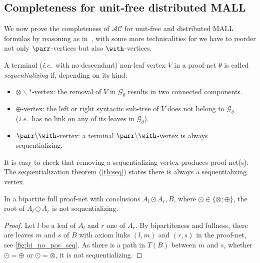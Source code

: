 \documentclass{lmcs}
\newcommand*{\tens}{\otimes} %
\newcommand*{\pw}{\parr\backslash\with} %
\newcommand*{\ie}{\emph{i.e.}}
\newcommand*{\G}{\mathcal{G}}
\newcommand*{\AC}{\mathcal{AC}} %
\begin{document}

\subsection{Completeness for unit-free distributed MALL}
\label{sec:compl_unit_free}

We now prove the completeness of $\AC$ for unit-free and distributed MALL formulas by reasoning as in~\cite[Section~4]{mllisos}, with some more technicalities for we have to reorder not only $\parr$-vertices but also $\with$-vertices.

\begin{defi}
\label{def:sequentializing}
A terminal (\ie\ with no descendant) non-leaf vertex $V$ in a proof-net $\theta$ is called \emph{sequentializing} if, depending on its kind:
\begin{itemize}
\item $\tens\backslash\ast$-vertex: the removal of $V$ in $\G_\theta$ results in two connected components.
\item $\oplus$-vertex: the left or right syntactic sub-tree of $V$ does not belong to $\G_\theta$ (\ie\ has no link on any of its leaves in $\G_\theta$).
\item $\pw$-vertex: a terminal $\pw$-vertex is always sequentializing.
\end{itemize}
\end{defi}

It is easy to check that removing a sequentializing vertex produces proof-net(s).
The sequentialization theorem (\autoref{th:seq}) states there is always a sequentializing vertex.

\begin{lem}
\label{lem:bi_no_pos_seq}
In a bipartite full proof-net with conclusions $A_l\odot A_r,B$, where $\odot\in\{\tens;\oplus\}$, the root of $A_l\odot A_r$ is not sequentializing.
\end{lem}
\begin{proof}
Let $l$ be a leaf of $A_l$ and $r$ one of $A_r$.
By bipartiteness and fullness, there are leaves $m$ and $s$ of $B$ with axiom links $(l,m)$ and $(r,s)$ in the proof-net, see \autoref{fig:bi_no_pos_seq}.
As there is a path in $T(B)$ between $m$ and $s$, whether $\odot=\oplus$ or $\odot=\tens$, it is not sequentializing.
\end{proof}
\end{document}
